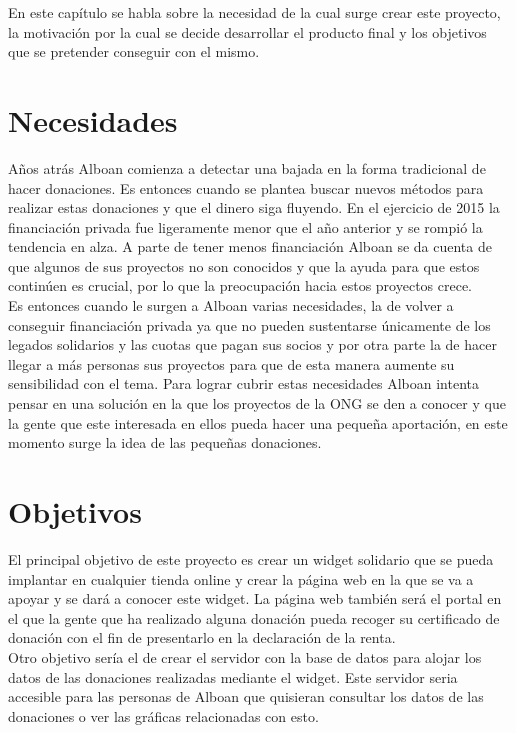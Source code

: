 \small %
En este capítulo se habla sobre la necesidad de la cual surge crear este proyecto, la motivación por la cual se decide desarrollar el producto final y los objetivos que se pretender conseguir con el mismo.

\section{Necesidades}





Años atrás Alboan comienza a detectar una bajada en la forma tradicional de hacer donaciones. Es entonces cuando se plantea buscar nuevos métodos para realizar estas donaciones y que el dinero siga fluyendo. En el ejercicio de 2015 la financiación privada fue ligeramente menor que el año anterior y se rompió la tendencia en alza. A parte de tener menos financiación Alboan se da cuenta de que algunos de sus proyectos no son conocidos y que la ayuda para que estos continúen es crucial, por lo que la preocupación hacia estos proyectos crece.\\

Es entonces cuando le surgen a Alboan varias necesidades, la de volver a conseguir financiación privada ya que no pueden sustentarse únicamente de los legados solidarios y las cuotas que pagan sus socios y por otra parte la de hacer llegar a más personas sus proyectos para que de esta manera aumente su sensibilidad con el tema. Para lograr cubrir estas necesidades Alboan intenta pensar en una solución en la que los proyectos de la ONG se den a conocer y que la gente que este interesada en ellos pueda hacer una pequeña aportación, en este momento surge la idea de las pequeñas donaciones.\\


\newpage

\section{Objetivos}

El principal objetivo de este proyecto es crear un widget solidario que se pueda implantar en cualquier tienda online y crear la página web en la que se va a apoyar y se dará a conocer este widget. La página web también será el portal en el que la gente que ha realizado alguna donación pueda recoger su certificado de donación con el fin de presentarlo en la declaración de la renta.\\
Otro objetivo sería el de crear el servidor con la base de datos para alojar los datos de las donaciones realizadas mediante el widget. Este servidor seria accesible para las personas de Alboan que quisieran consultar los datos de las donaciones o ver las gráficas relacionadas con esto.  \\

